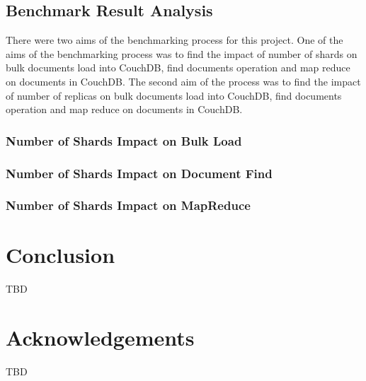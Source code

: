 \subsection{Benchmark Result Analysis}
There were two aims of the benchmarking process for this project. One
of the aims of the benchmarking process was to find the impact of
number of shards on bulk documents load into CouchDB, find documents
operation and map reduce on documents in CouchDB. The second aim of
the process was to find the impact of number of replicas on bulk
documents load into CouchDB, find documents operation and map reduce
on documents in CouchDB. 

\subsubsection{Number of Shards Impact on Bulk Load}
\subsubsection{Number of Shards Impact on Document Find}
\subsubsection{Number of Shards Impact on MapReduce}


\section{Conclusion}
TBD
\section*{Acknowledgements}

TBD


 





